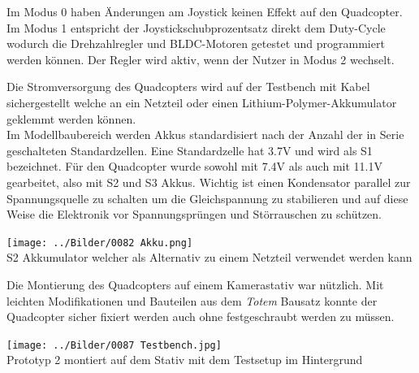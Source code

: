 Im Modus 0 haben Änderungen am Joystick keinen Effekt auf den Quadcopter. Im Modus 1 entspricht der Joystickschubprozentsatz direkt dem Duty-Cycle wodurch die Drehzahlregler und BLDC-Motoren getestet und programmiert werden können. Der Regler wird aktiv, wenn der Nutzer in Modus 2 wechselt.
\begin{center} 
\end{center}
Die Stromversorgung des Quadcopters wird auf der Testbench mit Kabel sichergestellt welche an ein Netzteil oder einen Lithium-Polymer-Akkumulator geklemmt werden können.\\
Im Modellbaubereich werden Akkus standardisiert nach der Anzahl der in Serie geschalteten Standardzellen. Eine Standardzelle hat 3.7V und wird als S1 bezeichnet. Für den Quadcopter wurde sowohl mit 7.4V als auch mit 11.1V gearbeitet, also mit S2 und S3 Akkus. Wichtig ist einen Kondensator parallel zur Spannungsquelle zu schalten um die Gleichspannung zu stabilieren und auf diese Weise die Elektronik vor Spannungsprüngen und Störrauschen zu 
schützen.
\begin{center}
	\texttt{[image: ../Bilder/0082 Akku.png]}{\\\label{Akku}S2 Akkumulator welcher als Alternativ zu einem Netzteil verwendet werden kann}
\end{center}
Die Montierung des Quadcopters auf einem Kamerastativ war nützlich. Mit leichten Modifikationen und Bauteilen aus dem \textit{Totem} Bausatz konnte der Quadcopter sicher fixiert werden auch ohne festgeschraubt werden zu müssen.
\begin{center}
	\texttt{[image: ../Bilder/0087 Testbench.jpg]}{\\Prototyp 2 montiert auf dem Stativ mit dem Testsetup im Hintergrund}
\end{center}

